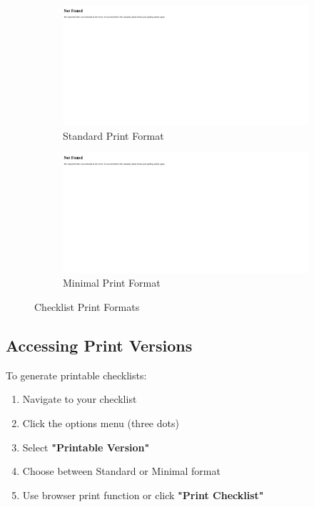 \begin{figure}[H]
\centering
\begin{subfigure}[b]{0.48\textwidth}
\includegraphics[width=\textwidth]{images/checklist_print_standard.png}
\caption{Standard Print Format}
\label{fig:print_standard}
\end{subfigure}
\hfill
\begin{subfigure}[b]{0.48\textwidth}
\includegraphics[width=\textwidth]{images/checklist_print_minimal.png}
\caption{Minimal Print Format}
\label{fig:print_minimal}
\end{subfigure}
\caption{Checklist Print Formats}
\label{fig:print_formats}
\end{figure}

\subsection{Accessing Print Versions}

To generate printable checklists:

\begin{enumerate}
    \item Navigate to your checklist
    \item Click the options menu (three dots)
    \item Select \textbf{"Printable Version"}
    \item Choose between Standard or Minimal format
    \item Use browser print function or click \textbf{"Print Checklist"}
\end{enumerate}

